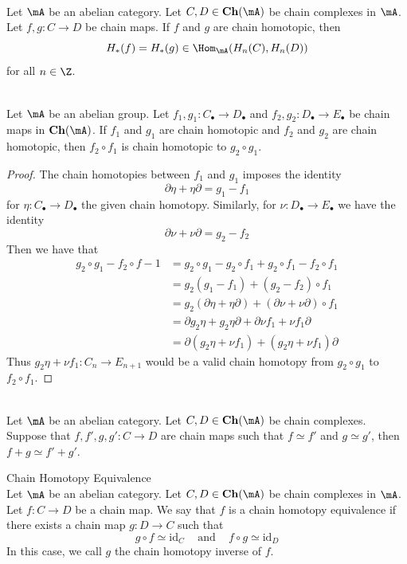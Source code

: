 \documentclass[a4paper]{article}
\begin{document}
\begin{lmm}{}{}\\
Let $\mA$ be an abelian category. Let $C,D\in\bold{Ch}(\mA)$ be chain complexes in $\mA$. Let $f,g:C\to D$ be chain maps. If $f$ and $g$ are chain homotopic, then $$H_\ast(f)=H_\ast(g)\in\Hom_\mA(H_n(C),H_n(D))$$ for all $n\in\Z$. 
\end{lmm}

\begin{prp}{}{}\\
Let $\mA$ be an abelian group. Let $f_1,g_1:C_\bullet\to D_\bullet$ and $f_2,g_2:D_\bullet\to E_\bullet$ be chain maps in $\bold{Ch}(\mA)$. If $f_1$ and $g_1$ are chain homotopic and $f_2$ and $g_2$ are chain homotopic, then $f_2\circ f_1$ is chain homotopic to $g_2\circ g_1$. 
\begin{proof}
The chain homotopies between $f_1$ and $g_1$ imposes the identity $$\partial\eta+\eta\partial=g_1-f_1$$ for $\eta:C_\bullet\to D_\bullet$ the given chain homotopy. Similarly, for $\nu:D_\bullet\to E_\bullet$ we have the identity $$\partial\nu+\nu\partial=g_2-f_2$$ Then we have that 
\begin{align*}
g_2\circ g_1-f_2\circ f-1&=g_2\circ g_1-g_2\circ f_1+g_2\circ f_1-f_2\circ f_1\\
&=g_2(g_1-f_1)+(g_2-f_2)\circ f_1\\
&=g_2(\partial\eta+\eta\partial)+(\partial\nu+\nu\partial)\circ f_1\\
&=\partial g_2\eta+g_2\eta\partial+\partial\nu f_1+\nu f_1\partial\\
&=\partial(g_2\eta+\nu f_1)+(g_2\eta+\nu f_1)\partial
\end{align*}
Thus $g_2\eta+\nu f_1:C_n\to E_{n+1}$ would be a valid chain homotopy from $g_2\circ g_1$ to $f_2\circ f_1$. 
\end{proof}
\end{prp}

\begin{prp}{}{}\\
Let $\mA$ be an abelian category. Let $C,D\in\bold{Ch}(\mA)$ be chain complexes. Suppose that $f,f',g,g':C\to D$ are chain maps such that $f\simeq f'$ and $g\simeq g'$, then $f+g\simeq f'+g'$. 
\end{prp}

\begin{defn}{Chain Homotopy Equivalence}{}\\
Let $\mA$ be an abelian category. Let $C,D\in\bold{Ch}(\mA)$ be chain complexes in $\mA$. Let $f:C\to D$ be a chain map. We say that $f$ is a chain homotopy equivalence if there exists a chain map $g:D\to C$ such that $$g\circ f\simeq\text{id}_C\;\;\;\text{ and }\;\;\;f\circ g\simeq\text{id}_D$$ In this case, we call $g$ the chain homotopy inverse of $f$. 
\end{defn}
\end{document}
